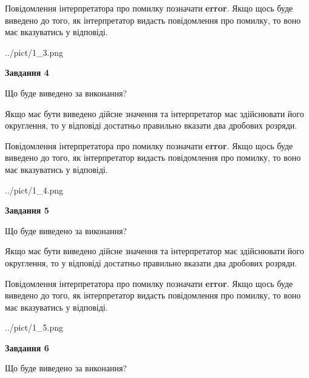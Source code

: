 \documentclass[12pt, ukrainian]{article}
\begin{document}
{\begin {Large}
Повідомлення інтерпретатора про помилку позначати \textbf{error}.
Якщо щось буде виведено до того, як інтерпретатор видасть повідомлення про помилку, 
то воно має вказуватись у відповіді. \par

\begin{center}
	{../pict/1_3.png}
\end{center}
\newpage

{\begin {center}\textbf{Завдання 4}\end {center}}\par
Що буде виведено за виконання? \par

Якщо має бути виведено дійсне значення та інтерпретатор має здійснювати його округлення, 
то у відповіді достатньо правильно вказати два дробових розряди.

Повідомлення інтерпретатора про помилку позначати \textbf{error}.
Якщо щось буде виведено до того, як інтерпретатор видасть повідомлення про помилку, 
то воно має вказуватись у відповіді. \par

\begin{center}
	{../pict/1_4.png}
\end{center}
\newpage

{\begin {center}\textbf{Завдання 5}\end {center}}\par
Що буде виведено за виконання? \par

Якщо має бути виведено дійсне значення та інтерпретатор має здійснювати його округлення, 
то у відповіді достатньо правильно вказати два дробових розряди.

Повідомлення інтерпретатора про помилку позначати \textbf{error}.
Якщо щось буде виведено до того, як інтерпретатор видасть повідомлення про помилку, 
то воно має вказуватись у відповіді. \par

\begin{center}
	{../pict/1_5.png}
\end{center}
\newpage

{\begin {center}\textbf{Завдання 6}\end {center}}\par
Що буде виведено за виконання? \par


\end{Large}}
\end{document}
